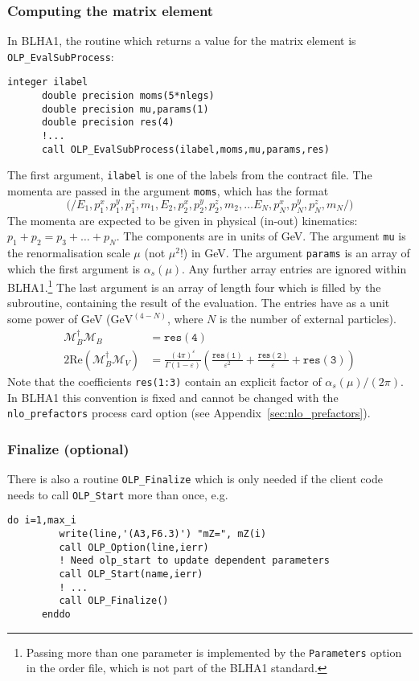 \subsubsection{Computing the matrix element}
In BLHA1, the routine which returns a value for the matrix element is \texttt{OLP\_EvalSubProcess}:
\begin{lstlisting}[style=fortran]
      integer ilabel
      double precision moms(5*nlegs)
      double precision mu,params(1)
      double precision res(4)
      !...
      call OLP_EvalSubProcess(ilabel,moms,mu,params,res)
\end{lstlisting}
The first argument, \texttt{ilabel} is one of the labels from the contract file. The momenta are passed in the argument \texttt{moms}, which has the format
\begin{displaymath}
\mathtt{(/}
E_1, p^x_1, p^y_1, p^z_1, m_1,
E_2, p^x_2, p^y_2, p^z_2, m_2, \ldots
E_N, p^x_N, p^y_N, p^z_N, m_N
\mathtt{/)}
\end{displaymath}
The momenta are expected to be given in physical (in-out) kinematics: $p_1+p_2=p_3+\ldots+p_N$. The components are in units of GeV. The argument \texttt{mu} is the renormalisation scale $\mu$ (not $\mu^2$!) in GeV. The argument \texttt{params} is an array of which the first argument is $\alpha_s(\mu)$. Any further array entries are ignored within BLHA1.\footnote{Passing more than one parameter is implemented by the \texttt{Parameters} option in the order file, which is  not part of the BLHA1 standard.} The last argument is an array of length four which is filled by the subroutine, containing the result of the evaluation. The entries have as a unit some power of GeV ($\mathrm{GeV}^{(4-N)}$, where $N$ is the number of external particles).
\begin{align}
\label{eq:res}
\mathcal{M}_B^\dagger\mathcal{M}_B&=\mathtt{res(4)}\nonumber\\
2\mathrm{Re}\left(\mathcal{M}_B^\dagger\mathcal{M}_V\right)&=
\frac{(4\pi)^\varepsilon}{\Gamma(1-\varepsilon)}\left(
\frac{\mathtt{res(1)}}{\varepsilon^2}
+\frac{\mathtt{res(2)}}{\varepsilon}
+\mathtt{res(3)}
\right)
\end{align}
Note that the coefficients \texttt{res(1:3)} contain an explicit factor of $\alpha_s(\mu)/(2\pi)$. In BLHA1 this convention is fixed and cannot be changed with the \texttt{nlo\_prefactors} process card option (see Appendix~\ref{sec:nlo_prefactors}).


\subsubsection{Finalize (optional)}
There is also a routine \texttt{OLP\_Finalize} which is only needed if the client code needs to call \texttt{OLP\_Start} more than once, e.g.
\begin{lstlisting}[style=fortran]
      do i=1,max_i
         write(line,'(A3,F6.3)') "mZ=", mZ(i)
         call OLP_Option(line,ierr)
         ! Need olp_start to update dependent parameters
         call OLP_Start(name,ierr)
         ! ...
         call OLP_Finalize()
      enddo
\end{lstlisting}

